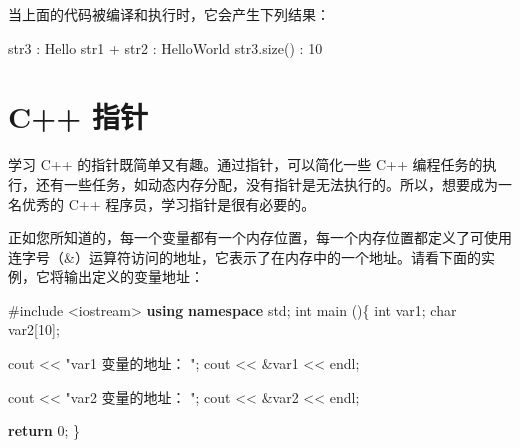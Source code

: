 \documentclass[
]{article}
\newenvironment{Shaded}{}{}
\newcommand{\ControlFlowTok}[1]{\textcolor[rgb]{0.00,0.44,0.13}{\textbf{#1}}}
\newcommand{\DataTypeTok}[1]{\textcolor[rgb]{0.56,0.13,0.00}{#1}}
\newcommand{\DecValTok}[1]{\textcolor[rgb]{0.25,0.63,0.44}{#1}}
\newcommand{\ImportTok}[1]{#1}
\newcommand{\KeywordTok}[1]{\textcolor[rgb]{0.00,0.44,0.13}{\textbf{#1}}}
\newcommand{\NormalTok}[1]{#1}
\newcommand{\OperatorTok}[1]{\textcolor[rgb]{0.40,0.40,0.40}{#1}}
\newcommand{\PreprocessorTok}[1]{\textcolor[rgb]{0.74,0.48,0.00}{#1}}
\newcommand{\StringTok}[1]{\textcolor[rgb]{0.25,0.44,0.63}{#1}}
\begin{document}
当上面的代码被编译和执行时，它会产生下列结果：

\begin{Shaded}
\begin{Highlighting}[]
\NormalTok{str3 }\OperatorTok{:}\NormalTok{ Hello}
\NormalTok{str1 }\OperatorTok{+}\NormalTok{ str2 }\OperatorTok{:}\NormalTok{ HelloWorld}
\NormalTok{str3}\OperatorTok{.}\NormalTok{size}\OperatorTok{()} \OperatorTok{:}  \DecValTok{10}
\end{Highlighting}
\end{Shaded}

\hypertarget{c-ux6307ux9488}{%
\section{C++ 指针}\label{c-ux6307ux9488}}

学习 C++ 的指针既简单又有趣。通过指针，可以简化一些 C++
编程任务的执行，还有一些任务，如动态内存分配，没有指针是无法执行的。所以，想要成为一名优秀的
C++ 程序员，学习指针是很有必要的。

正如您所知道的，每一个变量都有一个内存位置，每一个内存位置都定义了可使用连字号（\&）运算符访问的地址，它表示了在内存中的一个地址。请看下面的实例，它将输出定义的变量地址：

\begin{Shaded}
\begin{Highlighting}[]
\PreprocessorTok{\#include }\ImportTok{\textless{}iostream\textgreater{}}
\KeywordTok{using} \KeywordTok{namespace}\NormalTok{ std}\OperatorTok{;}
\DataTypeTok{int}\NormalTok{ main }\OperatorTok{()\{}
   \DataTypeTok{int}\NormalTok{  var1}\OperatorTok{;}
   \DataTypeTok{char}\NormalTok{ var2}\OperatorTok{[}\DecValTok{10}\OperatorTok{];}

\NormalTok{   cout }\OperatorTok{\textless{}\textless{}} \StringTok{"var1 变量的地址： "}\OperatorTok{;}
\NormalTok{   cout }\OperatorTok{\textless{}\textless{}} \OperatorTok{\&}\NormalTok{var1 }\OperatorTok{\textless{}\textless{}}\NormalTok{ endl}\OperatorTok{;}

\NormalTok{   cout }\OperatorTok{\textless{}\textless{}} \StringTok{"var2 变量的地址： "}\OperatorTok{;}
\NormalTok{   cout }\OperatorTok{\textless{}\textless{}} \OperatorTok{\&}\NormalTok{var2 }\OperatorTok{\textless{}\textless{}}\NormalTok{ endl}\OperatorTok{;}

   \ControlFlowTok{return} \DecValTok{0}\OperatorTok{;}
\OperatorTok{\}}
\end{Highlighting}
\end{Shaded}
\end{document}
